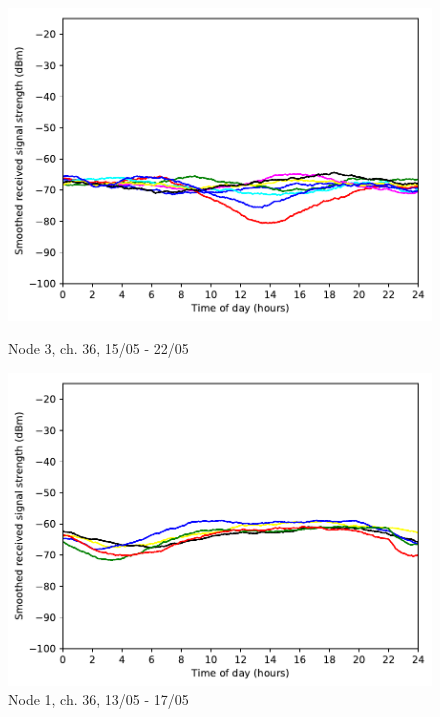 \documentclass[a4paper, 11pt]{article}
\begin{document}
\begin{figure}[!h]
\begin{minipage}{0.47\textwidth}
	\centering
	\includegraphics[width=\textwidth]{images/5_GHz/cot-node3-student_2017-05-22_chan36_image.pdf}
	\caption{Node 3, ch. 36, 15/05 - 22/05}
	\label{node3_ch36_usage}
\end{minipage}\hfill
\begin{minipage}{0.47\textwidth}
	\centering
	\includegraphics[width=\textwidth]{images/5_GHz/node1_2017-05-17_chan36_image.pdf}
	\caption{Node 1, ch. 36, 13/05 - 17/05}
	\label{node1_ch36_usage}
\end{minipage}\hfill
\end{figure}
\end{document}
